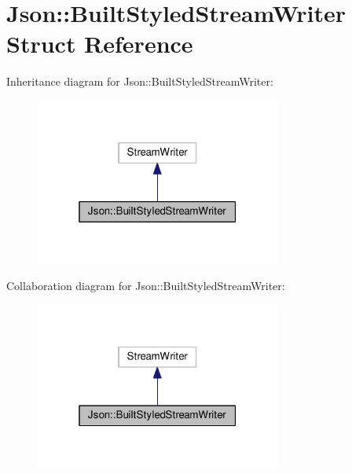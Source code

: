 \hypertarget{struct_json_1_1_built_styled_stream_writer}{}\section{Json\+:\+:Built\+Styled\+Stream\+Writer Struct Reference}
\label{struct_json_1_1_built_styled_stream_writer}


Inheritance diagram for Json\+:\+:Built\+Styled\+Stream\+Writer\+:
\nopagebreak
\begin{figure}[H]
\begin{center}
\leavevmode
\includegraphics[width=229pt]{struct_json_1_1_built_styled_stream_writer__inherit__graph}
\end{center}
\end{figure}


Collaboration diagram for Json\+:\+:Built\+Styled\+Stream\+Writer\+:
\nopagebreak
\begin{figure}[H]
\begin{center}
\leavevmode
\includegraphics[width=229pt]{struct_json_1_1_built_styled_stream_writer__coll__graph}
\end{center}
\end{figure}
